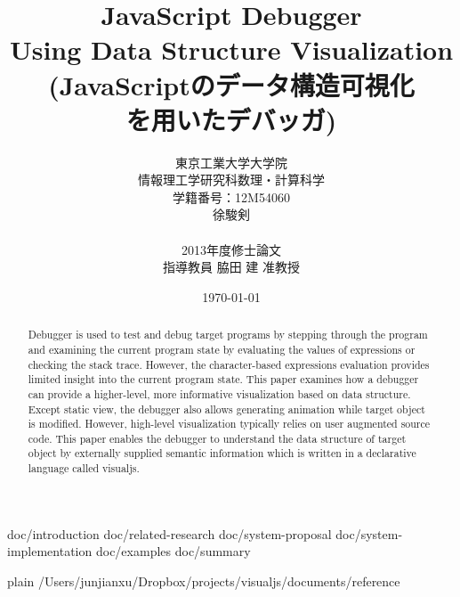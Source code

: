\documentclass [a4paper,11pt,fleqn]{report}
\title {JavaScript Debugger\\Using Data Structure Visualization\\(JavaScriptのデータ構造可視化\\を用いたデバッガ)}
\author {東京工業大学大学院\\情報理工学研究科数理・計算科学\\学籍番号：12M54060\\徐駿剣\\\\2013年度修士論文\\指導教員 脇田 建 准教授}
\date {\today}
\begin{document}
\maketitle

\begin {abstract}
Debugger is used to test and debug target programs by stepping through the program and examining the current program state by evaluating the values of expressions or checking the stack trace. However, the character-based expressions evaluation provides limited insight into the current program state. This paper examines how a debugger can provide a higher-level, more informative visualization based on data structure. Except static view, the debugger also allows generating animation while target object is modified. However, high-level visualization typically relies on user augmented source code. This paper enables the debugger to understand the data structure of target object by externally supplied semantic information which is written in a declarative language called visualjs.
\end {abstract}

\tableofcontents
\listoffigures

 {doc/introduction}
 {doc/related-research}
 {doc/system-proposal}
 {doc/system-implementation}
 {doc/examples}
 {doc/summary}

 {plain}
 {/Users/junjianxu/Dropbox/projects/visualjs/documents/reference}
\end{document}
